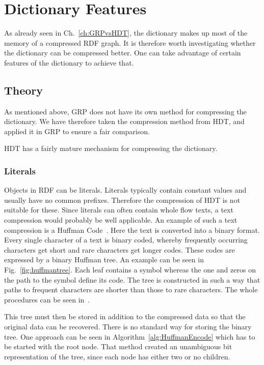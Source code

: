 \section{Dictionary Features}\label{sec:dictFeatures}

As already seen in Ch.~\ref{ch:GRPvsHDT}, the dictionary makes up most of the memory of a compressed RDF graph. It is therefore worth investigating whether the dictionary can be compressed better. One can take advantage of certain features of the dictionary to achieve that.

\subsection{Theory}

As mentioned above, GRP does not have its own method for compressing the dictionary. We have therefore taken the compression method from HDT, and applied it in GRP to ensure a fair comparison.

HDT has a fairly mature mechanism for compressing the dictionary.

\subsubsection{Literals}

Objects in RDF can be literals. Literals typically contain constant values and usually have no common prefixes. Therefore the compression of HDT is not suitable for these. Since literals can often contain whole flow texts, a text compression would probably be well applicable. An example of such a text compression is a Huffman Code~\cite{huffman}. Here the text is converted into a binary format. Every single character of a text is binary coded, whereby frequently occurring characters get short and rare characters get longer codes. These codes are expressed by a binary Huffman tree. An example can be seen in Fig.~\ref{fig:huffmantree}. Each leaf contains a symbol whereas the one and zeros on the path to the symbol define its code. The tree is constructed in such a way that paths to frequent characters are shorter than those to rare characters. The whole procedures can be seen in~\cite{huffman}.

This tree must then be stored in addition to the compressed data so that the original data can be recovered. There is no standard way for storing the binary tree. One approach can be seen in Algorithm~\ref{alg:HuffmanEncode} which has to be started with the root node. That method created an unambiguous bit representation of the tree, since each node has either two or no children.


